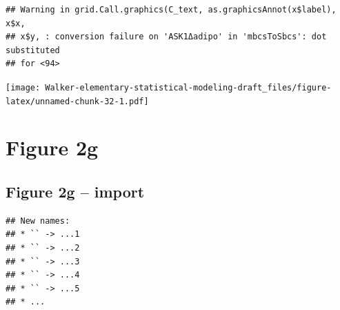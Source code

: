 \documentclass[]{book}
\newenvironment{Shaded}{\begin{snugshade}}{\end{snugshade}}
\newcommand{\CommentTok}[1]{\textcolor[rgb]{0.56,0.35,0.01}{\textit{#1}}}
\newcommand{\DataTypeTok}[1]{\textcolor[rgb]{0.13,0.29,0.53}{#1}}
\newcommand{\DecValTok}[1]{\textcolor[rgb]{0.00,0.00,0.81}{#1}}
\newcommand{\ErrorTok}[1]{\textcolor[rgb]{0.64,0.00,0.00}{\textbf{#1}}}
\newcommand{\KeywordTok}[1]{\textcolor[rgb]{0.13,0.29,0.53}{\textbf{#1}}}
\newcommand{\NormalTok}[1]{#1}
\newcommand{\OperatorTok}[1]{\textcolor[rgb]{0.81,0.36,0.00}{\textbf{#1}}}
\newcommand{\OtherTok}[1]{\textcolor[rgb]{0.56,0.35,0.01}{#1}}
\newcommand{\StringTok}[1]{\textcolor[rgb]{0.31,0.60,0.02}{#1}}
\begin{document}
\begin{verbatim}
## Warning in grid.Call.graphics(C_text, as.graphicsAnnot(x$label), x$x,
## x$y, : conversion failure on 'ASK1Δadipo' in 'mbcsToSbcs': dot substituted
## for <94>
\end{verbatim}

\texttt{[image: Walker-elementary-statistical-modeling-draft\_files/figure-latex/unnamed-chunk-32-1.pdf]}

\hypertarget{figure-2g}{%
\section{Figure 2g}\label{figure-2g}}

\hypertarget{figure-2g-import}{%
\subsection{Figure 2g -- import}\label{figure-2g-import}}

\begin{Shaded}
\end{Shaded}

\begin{verbatim}
## New names:
## * `` -> ...1
## * `` -> ...2
## * `` -> ...3
## * `` -> ...4
## * `` -> ...5
## * ...
\end{verbatim}

\begin{Shaded}
\end{Shaded}
\end{document}
